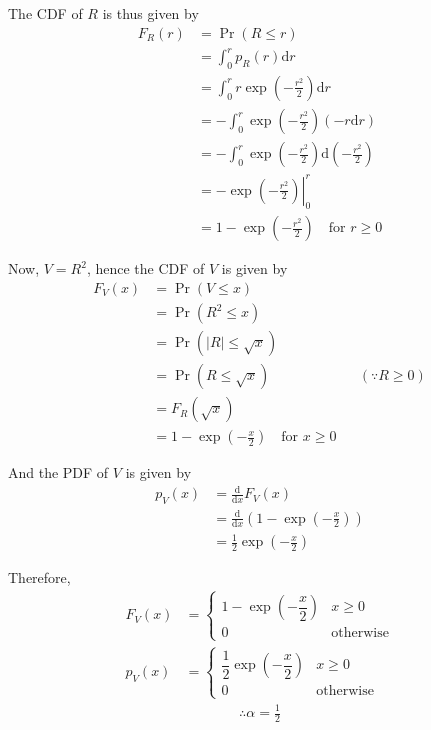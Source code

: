 \documentclass[journal,12pt,twocolumn]{IEEEtran}
\providecommand{\pr}[1]{\ensuremath{\Pr\left(#1\right)}}
\providecommand{\brak}[1]{\ensuremath{\left(#1\right)}}
\providecommand{\der}[1]{\mathrm{d} #1}
\numberwithin{equation}{section}
\renewcommand\thesection{\arabic{section}}
\begin{document}
\begin{enumerate}[label=\thesection.\arabic*,ref=\thesection.\theenumi]
	The CDF of $R$ is thus given by
	\begin{align}
		F_R(r) &= \pr{R \le r} \\
		&= \int_0^r p_R(r) \der{r} \\
		&= \int_0^r r \exp\brak{-\frac{r^2}{2}} \der{r} \\
		&= - \int_0^r \exp\brak{-\frac{r^2}{2}} (-r\der{r}) \\
		&= - \int_0^r \exp\brak{-\frac{r^2}{2}} \der\brak{-\frac{r^2}{2}} \\
		&= - \left. \exp\brak{-\frac{r^2}{2}} \right|_0^r \\
		&= 1 - \exp\brak{-\frac{r^2}{2}} \quad \text{for } r \ge 0
	\end{align}		
	
	Now, $V = R^2$, hence the CDF of $V$ is given by
	\begin{align}
		F_V(x) &= \pr{V \le x} \\
		&= \pr{R^2 \le x} \\
		&= \pr{|R| \le \sqrt{x}} \\
		&= \pr{R \le \sqrt{x}} && (\because R \ge 0) \\
		&= F_R(\sqrt{x}) \\
		&= 1 - \exp\brak{-\frac{x}{2}} \quad \text{for } x \ge 0
	\end{align}
	
	And the PDF of $V$ is given by
	\begin{align}
		p_V(x) &= \frac{\der{}}{\der{x}} F_V(x) \\
		&= \frac{\der{}}{\der{x}} \brak{1 - \exp\brak{-\frac{x}{2}}} \\
		&= \frac12 \exp\brak{-\frac{x}{2}} 
	\end{align}
	
	Therefore,
	\begin{align}
		F_V(x) &= 
		\begin{cases}
			1 - \exp\brak{-\dfrac{x}{2}} & x \geq 0 \\
			0 & \text{otherwise}
		\end{cases}	\\
		p_V(x) &= 
		\begin{cases}
			\dfrac12 \exp\brak{-\dfrac{x}{2}} & x \geq 0 \\
			0 & \text{otherwise}
		\end{cases}
	\end{align}
	\begin{align}
		\therefore \alpha = \frac12
	\end{align}
	

\end{enumerate}
\end{document}
